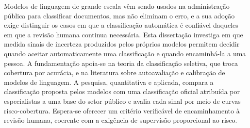 
\begin{resumo}
Modelos de linguagem de grande escala vêm sendo usados na administração
pública para classificar documentos, mas não eliminam o erro, e a sua adoção
exige distinguir os casos em que a classificação automática é confiável
daqueles em que a revisão humana continua necessária. Esta dissertação
investiga em que medida sinais de incerteza produzidos pelos próprios modelos
permitem decidir quando aceitar automaticamente uma classificação e quando
encaminhá-la a uma pessoa. A fundamentação apoia-se na teoria da
classificação seletiva, que troca cobertura por acurácia, e na literatura
sobre autoavaliação e calibração de modelos de linguagem. A pesquisa,
quantitativa e aplicada, compara a classificação proposta pelos modelos com
uma classificação oficial atribuída por especialistas a uma base do setor
público e avalia cada sinal por meio de curvas risco-cobertura. Espera-se
oferecer um critério verificável de encaminhamento à revisão humana,
coerente com a exigência de supervisão proporcional ao risco.
\end{resumo}
